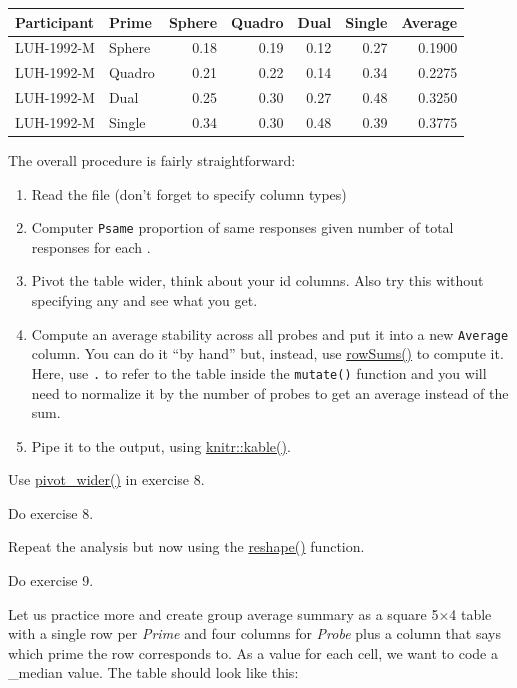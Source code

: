 \documentclass[
]{book}
\providecommand{\tightlist}{%
  \setlength{\itemsep}{0pt}\setlength{\parskip}{0pt}}
\begin{document}
\begin{tabular}{l|l|r|r|r|r|r}
\hline
Participant & Prime & Sphere & Quadro & Dual & Single & Average\\
\hline
LUH-1992-M & Sphere & 0.18 & 0.19 & 0.12 & 0.27 & 0.1900\\
\hline
LUH-1992-M & Quadro & 0.21 & 0.22 & 0.14 & 0.34 & 0.2275\\
\hline
LUH-1992-M & Dual & 0.25 & 0.30 & 0.27 & 0.48 & 0.3250\\
\hline
LUH-1992-M & Single & 0.34 & 0.30 & 0.48 & 0.39 & 0.3775\\
\hline
\end{tabular}

The overall procedure is fairly straightforward:

\begin{enumerate}
\def\labelenumi{\arabic{enumi}.}
\tightlist
\item
  Read the file (don't forget to specify column types)
\item
  Computer \texttt{Psame} proportion of same responses given number of total responses for each .
\item
  Pivot the table wider, think about your id columns. Also try this without specifying any and see what you get.
\item
  Compute an average stability across all probes and put it into a new \texttt{Average} column. You can do it ``by hand'' but, instead, use \href{https://stat.ethz.ch/R-manual/R-devel/library/base/html/colSums.html}{rowSums()} to compute it. Here, use \texttt{.} to refer to the table inside the \texttt{mutate()} function and you will need to normalize it by the number of probes to get an average instead of the sum.
\item
  Pipe it to the output, using \href{https://bookdown.org/yihui/rmarkdown-cookbook/kable.html}{knitr::kable()}.
\end{enumerate}

Use \href{https://tidyr.tidyverse.org/reference/pivot_wider.html}{pivot\_wider()} in exercise 8.

Do exercise 8.

Repeat the analysis but now using the \href{https://stat.ethz.ch/R-manual/R-patched/library/stats/html/reshape.html}{reshape()} function.

Do exercise 9.

Let us practice more and create group average summary as a square 5×4 table with a single row per \emph{Prime} and four columns for \emph{Probe} plus a column that says which prime the row corresponds to. As a value for each cell, we want to code a \_median value. The table should look like this:
\end{document}
